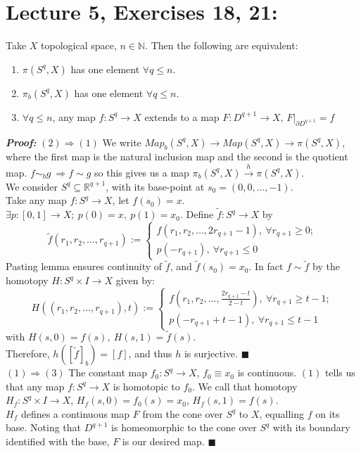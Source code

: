 \documentclass[11pt]{article}
\numberwithin{equation}{section}
\begin{document}
\section{\normalsize{Lecture 5, Exercises 18, 21:}}
\begin{clm}
     Take $X$ topological space, $n\in \mathbb{N}$. Then the following are equivalent:
     \begin{enumerate}
          \item $\pi(S^q,X)$ has one element $\forall q\leqslant n$.
          \item $\pi_b(S^q,X)$ has one element $\forall q\leqslant n$.
          \item $\forall q\leqslant n$, any map $f:S^q\rightarrow X$ extends to a map $F:D^{q+1}\rightarrow X$, $F|_{\partial D^{q+1}}=f$
     \end{enumerate}
\end{clm}
\textbf{\emph{Proof:}}
$\mathit{(2)\Rightarrow(1)}$ We write $Map_b(S^q,X)\rightarrow Map(S^q,X)\rightarrow \pi(S^q,X)$, where the first map is the natural inclusion map and the second is the quotient map. $f\sim_b g\ \Rightarrow f\sim g$ so this gives us a map $\pi_b(S^q,X)\xrightarrow{h} \pi(S^q,X)$. \\ 
We consider $S^q\subseteq \mathbb{R}^{q+1}$, with its base-point at $s_0=(0,0,\dots,-1)$.\\ Take any map $f:S^q\rightarrow X$, let $f(s_0)=x$. $\exists p:[0,1]\rightarrow X;\ p(0)=x,\ p(1)=x_0$. Define $\tilde{f}:S^q\rightarrow X$ by $$\tilde{f}(r_1,r_2,\dots,r_{q+1}):=\begin{cases}f(r_1,r_2,\dots, 2r_{q+1}-1),\ \forall r_{q+1}\geqslant 0;\\ p(-r_{q+1}),\ \forall r_{q+1}\leqslant 0\end{cases}$$ Pasting lemma ensures continuity of $\tilde{f}$, and $\tilde{f}(s_0)=x_0$. In fact $f\sim\tilde{f}$ by the homotopy $H: S^q\times I \rightarrow X$ given by: $$H((r_1,r_2,\dots,r_{q+1}),t):= \begin{cases}f\left(r_1,r_2,\dots,\frac{2r_{q+1}-t}{2-t} \right),\ \forall r_{q+1}\geqslant t-1;\\ p(-r_{q+1}+t-1),\ \forall r_{q+1}\leqslant t-1\end{cases}$$ with $H(s,0)=f(s),\ H(s,1)=\tilde{f}(s)$. \\ Therefore, $h([\tilde{f}]_b)=[f]$, and thus $h$ is surjective. $\blacksquare$ \\[10pt]
$\mathit{(1)\Rightarrow (3)}$ The constant map $f_0:S^q\rightarrow X$, $f_0\equiv x_0$ is continuous. $(1)$ tells us that any map $f:S^q\rightarrow X$ is homotopic to $f_0$. We call that homotopy $H_f:S^q\times I\rightarrow X$, $H_f(s,0)=f_0(s)=x_0$, $H_f(s,1)=f(s)$. \\ $H_f$ defines a continuous map $F$ from the cone over $S^q$ to $X$, equalling $f$ on its base. Noting that $D^{q+1}$ is homeomorphic to the cone over $S^q$ with its boundary identified with the base, $F$ is our desired map. $\blacksquare$ \\[10pt]
\end{document}
